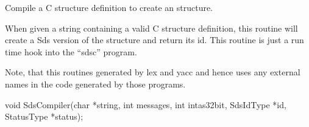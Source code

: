 \begin{manroutinedescription}
      Compile a C structure definition to create an {} structure.

      When given a string containing a valid C structure definition,
      this routine will create a Sds version of the structure and return
      its id.  This routine is just a run time hook into the ``sdsc'' program.

	Note, that this routines generated by lex and yacc and hence uses
	any external names in the code generated by those programs.


	void SdsCompiler(char *string, int messages, int intas32bit, SdsIdType *id, %
StatusType *status);


\end{manroutinedescription}
